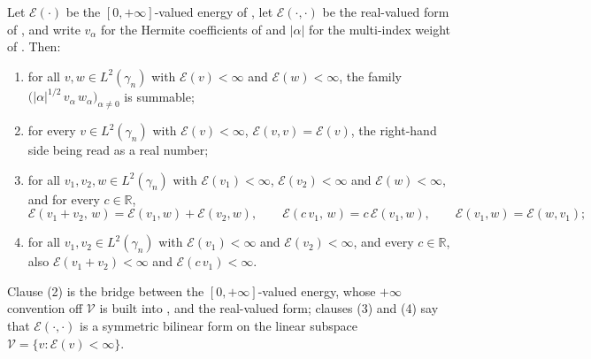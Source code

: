 \begin{lemma}
Let $\mathcal{E}(\cdot)$ be the $[0,+\infty]$-valued energy of ,
let $\mathcal{E}(\cdot,\cdot)$ be the real-valued form of ,
and write $v_\alpha$ for the Hermite coefficients of  and
$|\alpha|$ for the multi-index weight of .  Then:
\begin{enumerate}
\item for all $v, w \in L^2(\gamma_n)$ with $\mathcal{E}(v) < \infty$ and
$\mathcal{E}(w) < \infty$, the family
$\bigl(|\alpha|^{1/2}\,v_\alpha\,w_\alpha\bigr)_{\alpha \neq 0}$ is summable;
\item for every $v \in L^2(\gamma_n)$ with $\mathcal{E}(v) < \infty$,
$\mathcal{E}(v,v) = \mathcal{E}(v)$, the right-hand side being read as a real
number;
\item for all $v_1, v_2, w \in L^2(\gamma_n)$ with $\mathcal{E}(v_1) < \infty$,
$\mathcal{E}(v_2) < \infty$ and $\mathcal{E}(w) < \infty$, and for every
$c \in \mathbb{R}$,
\[
  \mathcal{E}(v_1+v_2,\,w) = \mathcal{E}(v_1,w) + \mathcal{E}(v_2,w),
  \qquad
  \mathcal{E}(c\,v_1,\,w) = c\,\mathcal{E}(v_1,w),
  \qquad
  \mathcal{E}(v_1,w) = \mathcal{E}(w,v_1);
\]
\item for all $v_1, v_2 \in L^2(\gamma_n)$ with $\mathcal{E}(v_1) < \infty$ and
$\mathcal{E}(v_2) < \infty$, and every $c \in \mathbb{R}$, also
$\mathcal{E}(v_1+v_2) < \infty$ and $\mathcal{E}(c\,v_1) < \infty$.
\end{enumerate}
Clause (2) is the bridge between the $[0,+\infty]$-valued energy, whose
$+\infty$ convention off $\mathcal{V}$ is built into , and the
real-valued form; clauses (3) and (4) say that $\mathcal{E}(\cdot,\cdot)$ is a
symmetric bilinear form on the linear subspace
$\mathcal{V} = \{v : \mathcal{E}(v) < \infty\}$.
\end{lemma}
